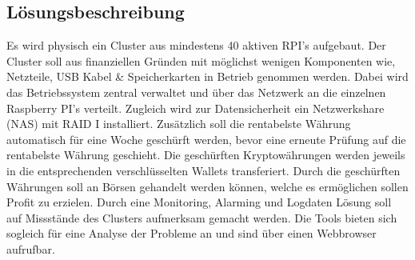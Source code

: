 
\subsection{Lösungsbeschreibung}
Es wird physisch ein Cluster aus mindestens 40 aktiven RPI's aufgebaut. Der Cluster soll aus finanziellen Gründen mit möglichst wenigen Komponenten wie, Netzteile, USB Kabel \& Speicherkarten in Betrieb genommen werden. Dabei wird das Betriebssystem zentral verwaltet und über das Netzwerk an die einzelnen Raspberry PI's verteilt. Zugleich wird zur Datensicherheit ein Netzwerkshare (NAS) mit RAID I installiert. Zusätzlich soll die rentabelste Währung automatisch für eine Woche geschürft werden, bevor eine erneute Prüfung auf die rentabelste Währung geschieht. Die geschürften Kryptowährungen werden jeweils in die entsprechenden verschlüsselten Wallets transferiert. Durch die geschürften Währungen soll an Börsen gehandelt werden können, welche es ermöglichen sollen Profit zu erzielen. Durch eine Monitoring, Alarming und Logdaten Lösung soll auf Missstände des Clusters aufmerksam gemacht werden. Die Tools bieten sich sogleich für eine Analyse der Probleme an und sind über einen Webbrowser aufrufbar.   
